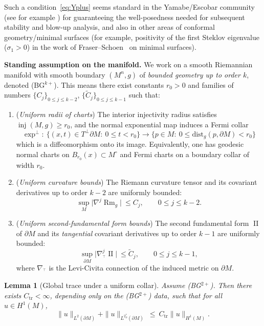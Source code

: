 \documentclass[11pt,reqno,a4paper]{amsart}
\DeclareMathOperator{\II}{II}
\numberwithin{equation}{section}
\newcommand{\dist}{\mathrm{dist}}
\theoremstyle{plain}
\newtheorem{lemma}[theorem]{Lemma}
\theoremstyle{remark}
\theoremstyle{plain}
\begin{document}
    Such a condition~\eqref{eq:Yplus} seems standard in the Yamabe/Escobar community (see for example \cite{EscobarAnnals92,EscobarJDG92, Marques2005,HanLi1999}) for guaranteeing the well-posedness needed for subsequent stability and blow-up analysis, and also in other areas of conformal geometry/minimal surfaces (for example, positivity of the first Steklov eigenvalue ($\sigma_1>0$) in the work of Fraser--Schoen~\cite{FraserSchoen2011} on minimal surfaces).


\noindent\textbf{Standing assumption on the manifold.}
We work on a smooth Riemannian manifold with smooth boundary $(M^n,g)$ of \emph{bounded geometry up to order $k$}, denoted \textup{(BG$^{k+}$)}. This means there exist constants $r_0>0$ and families of numbers $\{C_j\}_{0\le j\le k-2}$, $\{\widetilde C_j\}_{0\le j\le k-1}$ such that:
\begin{enumerate}[label=(\roman*),leftmargin=1.25em]
\item (\emph{Uniform radii of charts}) The interior injectivity radius satisfies $\operatorname{inj}(M,g)\ge r_0$, and the normal exponential map induces a Fermi collar
\[
\exp^\perp:\ \{(x,t)\in T^\perp\partial M:\ 0\le t<r_0\}\longrightarrow \{p\in M:\ 0\le \dist_g(p,\partial M)<r_0\}
\]
 which is a diffeomorphism onto its image. Equivalently, one has geodesic normal charts on $B_{r_0}(x)\subset M^\circ$ and Fermi charts on a boundary collar of width $r_0$.
\item (\emph{Uniform curvature bounds}) The Riemann curvature tensor and its covariant derivatives up to order $k-2$ are uniformly bounded:
\[
\sup_{M}\bigl|\nabla^j \operatorname{Rm}_g\bigr|\ \le C_j,\qquad 0\le j\le k-2.
\]
\item (\emph{Uniform second-fundamental form bounds}) The second fundamental form $\II$ of $\partial M$ and its \emph{tangential} covariant derivatives up to order $k-1$ are uniformly bounded:
\[
\sup_{\partial M}\bigl|\nabla^{j}_{{}^\top}\II\bigr|\ \le \widetilde C_j,\qquad 0\le j\le k-1,
\]
 where $\nabla_{{}^\top}$ is the Levi-Civita connection of the induced metric on $\partial M$.
\end{enumerate}
\begin{lemma}[Global trace under a uniform collar]\label{lem:global-trace}
Assume \textup{(BG$^{2+}$)}. Then there exists $C_{\mathrm{tr}}<\infty$, depending only on the \textup{(BG$^{2+}$)} data, such that for all $u\in H^1(M)$,
\[
\|u\|_{L^2(\partial M)} + \|u\|_{L^{2^*_\partial}(\partial M)} \ \le\ C_{\mathrm{tr}}\|u\|_{H^1(M)}.
\]
\end{lemma}
\end{document}
